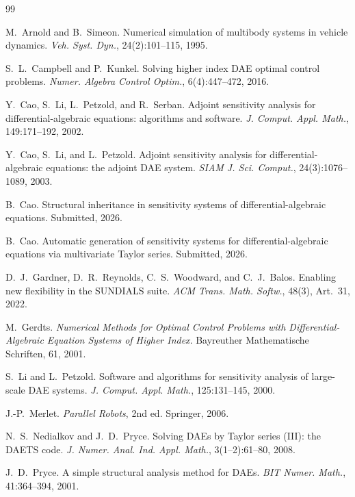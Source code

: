 \documentclass[12pt,a4paper]{article}
\theoremstyle{definition}
\theoremstyle{plain}
\begin{document}
\begin{thebibliography}{99}

M.\ Arnold and B.\ Simeon.
Numerical simulation of multibody systems in vehicle dynamics.
\textit{Veh. Syst. Dyn.}, 24(2):101--115, 1995.

S.\ L.\ Campbell and P.\ Kunkel.
Solving higher index DAE optimal control problems.
\textit{Numer. Algebra Control Optim.}, 6(4):447--472, 2016.

Y.\ Cao, S.\ Li, L.\ Petzold, and R.\ Serban.
Adjoint sensitivity analysis for differential-algebraic equations: algorithms and software.
\textit{J. Comput. Appl. Math.}, 149:171--192, 2002.

Y.\ Cao, S.\ Li, and L.\ Petzold.
Adjoint sensitivity analysis for differential-algebraic equations: the adjoint DAE system.
\textit{SIAM J. Sci. Comput.}, 24(3):1076--1089, 2003.

B.\ Cao.
Structural inheritance in sensitivity systems of differential-algebraic equations.
Submitted, 2026.

B.\ Cao.
Automatic generation of sensitivity systems for differential-algebraic equations via multivariate Taylor series.
Submitted, 2026.

D.\ J.\ Gardner, D.\ R.\ Reynolds, C.\ S.\ Woodward, and C.\ J.\ Balos.
Enabling new flexibility in the SUNDIALS suite.
\textit{ACM Trans. Math. Softw.}, 48(3), Art.\ 31, 2022.

M.\ Gerdts.
\textit{Numerical Methods for Optimal Control Problems with Differential-Algebraic Equation Systems of Higher Index}. Bayreuther Mathematische Schriften, 61, 2001.

S.\ Li and L.\ Petzold.
Software and algorithms for sensitivity analysis of large-scale DAE systems.
\textit{J. Comput. Appl. Math.}, 125:131--145, 2000.

J.-P.\ Merlet.
\textit{Parallel Robots}, 2nd ed.
Springer, 2006.

N.\ S.\ Nedialkov and J.\ D.\ Pryce.
Solving DAEs by Taylor series (III): the DAETS code.
\textit{J. Numer. Anal. Ind. Appl. Math.}, 3(1--2):61--80, 2008.

J.\ D.\ Pryce.
A simple structural analysis method for DAEs.
\textit{BIT Numer. Math.}, 41:364--394, 2001.


\end{thebibliography}
\end{document}
